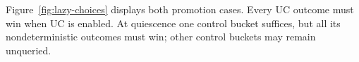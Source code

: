 Figure~\ref{fig:lazy-choices} displays both promotion cases. Every UC outcome must win when UC is enabled. At quiescence one control bucket suffices, but all its nondeterministic outcomes must win; other control buckets may remain unqueried.

